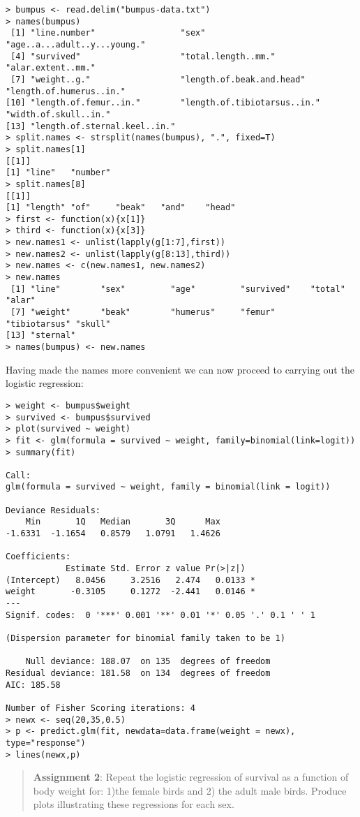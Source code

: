 \documentclass{article}
\begin{document}
\begin{lstlisting}
> bumpus <- read.delim("bumpus-data.txt")
> names(bumpus)
 [1] "line.number"                 "sex"                         "age..a...adult..y...young." 
 [4] "survived"                    "total.length..mm."           "alar.extent..mm."           
 [7] "weight..g."                  "length.of.beak.and.head"     "length.of.humerus..in."     
[10] "length.of.femur..in."        "length.of.tibiotarsus..in."  "width.of.skull..in."        
[13] "length.of.sternal.keel..in."
> split.names <- strsplit(names(bumpus), ".", fixed=T)
> split.names[1]
[[1]]
[1] "line"   "number"
> split.names[8]
[[1]]
[1] "length" "of"     "beak"   "and"    "head"  
> first <- function(x){x[1]}
> third <- function(x){x[3]}
> new.names1 <- unlist(lapply(g[1:7],first))
> new.names2 <- unlist(lapply(g[8:13],third))
> new.names <- c(new.names1, new.names2)
> new.names
 [1] "line"        "sex"         "age"         "survived"    "total"       "alar"       
 [7] "weight"      "beak"        "humerus"     "femur"       "tibiotarsus" "skull"      
[13] "sternal"   
> names(bumpus) <- new.names
\end{lstlisting}
Having made the names more convenient we can now proceed to carrying out
the logistic regression:

\begin{lstlisting}
> weight <- bumpus$weight
> survived <- bumpus$survived
> plot(survived ~ weight)
> fit <- glm(formula = survived ~ weight, family=binomial(link=logit))
> summary(fit)

Call:
glm(formula = survived ~ weight, family = binomial(link = logit))

Deviance Residuals: 
    Min       1Q   Median       3Q      Max  
-1.6331  -1.1654   0.8579   1.0791   1.4626  

Coefficients:
            Estimate Std. Error z value Pr(>|z|)  
(Intercept)   8.0456     3.2516   2.474   0.0133 *
weight       -0.3105     0.1272  -2.441   0.0146 *
---
Signif. codes:  0 '***' 0.001 '**' 0.01 '*' 0.05 '.' 0.1 ' ' 1 

(Dispersion parameter for binomial family taken to be 1)

    Null deviance: 188.07  on 135  degrees of freedom
Residual deviance: 181.58  on 134  degrees of freedom
AIC: 185.58

Number of Fisher Scoring iterations: 4
> newx <- seq(20,35,0.5)
> p <- predict.glm(fit, newdata=data.frame(weight = newx), type="response")
> lines(newx,p)
\end{lstlisting}
\begin{quote}
\textbf{Assignment 2}: Repeat the logistic regression of survival as a
function of body weight for: 1)the female birds and 2) the adult male
birds. Produce plots illustrating these regressions for each sex.

\end{quote}
\end{document}
